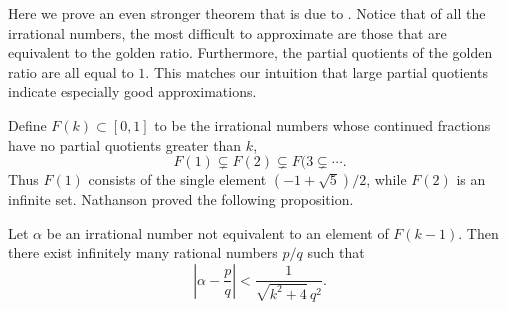 Here we prove an even stronger theorem that is due to {\Nathanson}
\cite{Nathanson1974-ye}.  Notice that of all the irrational numbers,  the
most difficult to approximate are those that are equivalent to the
golden ratio.  Furthermore, the partial quotients of the golden ratio
are all equal to $1$.  This matches our intuition that large partial
quotients indicate especially good approximations.

Define $F(k) \subset [0, 1]$ to be the irrational numbers whose
continued fractions have no partial quotients greater than $k$,
\[
F(1) \varsubsetneq F(2) \varsubsetneq F(3  \varsubsetneq  \cdots.
\]
Thus $F(1)$ consists of the single element $(-1 + \sqrt{5})/2$, while
$F(2)$ is an infinite set.  Nathanson proved the following
proposition.

\begin{proposition}[Nathanson] \label{Nathanson:Prop}
Let $\alpha$ be an irrational number not equivalent to an element of
$F(k-1)$.  Then there exist infinitely many rational numbers $p/q$ such
that
\[
\left|\alpha - \frac{p}{q}\right| < \frac{1}{\sqrt{k^2 + 4} \, q^2}.
\]
\end{proposition}

